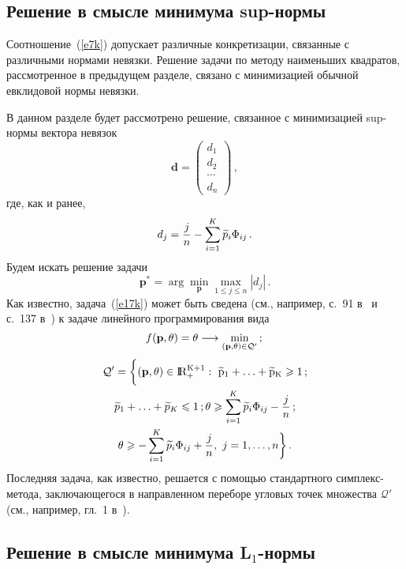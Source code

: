 \begin{multicols}{2}
\subsection{Решение в смысле минимума sup-нормы}

Соотношение~(\ref{e7k}) допускает различные конкретизации, связанные с
различными нормами невязки. Решение задачи по методу наименьших
квадратов, рассмотренное в предыдущем разделе, связано с
минимизацией обычной евклидовой нормы невязки.

В данном разделе будет рассмотрено решение, связанное с
минимизацией sup-нормы вектора невязок
$$
{\mathbf d}=
\begin{pmatrix}
d_1\\[3pt]
d_2\\[3pt]
\cdots\\[3pt]
d_n \end{pmatrix}\,,
$$
где, как и ранее,
$$
d_j=\displaystyle\frac{\displaystyle j\mathstrut}{\displaystyle n\mathstrut}-\sum_{i=1}^K\widetilde p_i\Phi_{ij}\,.
$$
Будем искать решение задачи
\begin{equation}
{\mathbf p}^*=\arg\min_{\mathbf
p}\max_{1\le j\le n}|d_j|\,.
\label{e17k}
\end{equation}
Как известно, задача~(\ref{e17k})
может быть сведена (см., например, с.~91 в~\cite{7k} и с.~137 в~\cite{8k}) к
задаче линейного программирования вида
\begin{equation}
f({\mathbf p},\theta)=\theta\longrightarrow\min_{({\mathbf
p},\theta)\in{\mathcal Q'}}\,;
\label{e18k}\\
\end{equation}
\begin{multline}
{\mathcal
Q'}=\bigg\{({\mathbf p},{\mathbf \theta})\in\rm I\hspace{-0.7mm}\rm R_+^{K+1}:\
\widetilde p_1+\ldots+\widetilde p_K\geqslant 1\,;\\
\widetilde p_1+\ldots+\widetilde p_K \leqslant 1\,;
\theta\geqslant\sum_{i=1}^K
\widetilde p_i\Phi_{ij}-\displaystyle\frac{\displaystyle j\mathstrut}{\displaystyle n\mathstrut}\,;\\
\theta \geqslant-\sum_{i=1}^K
\widetilde p_i\Phi_{ij}+\displaystyle\frac{\displaystyle j\mathstrut}{\displaystyle n\mathstrut},\
j=1,\ldots,n\bigg\}\,. \label{e19k}
\end{multline}
Последняя задача, как известно,
решается с помощью стандартного симплекс-метода, заключающегося в
направленном переборе угловых точек множества ${\mathcal Q'}$
(см., например, гл.~1 в~\cite{7k}).

\subsection{Решение в смысле минимума L$_1$-нормы}


\end{multicols}
